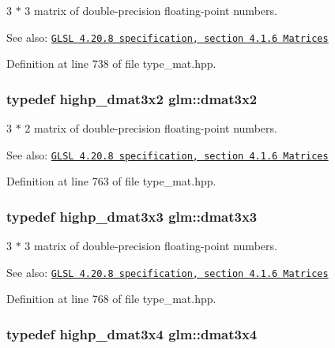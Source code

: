 3 $\ast$ 3 matrix of double-precision floating-point numbers.

\begin{Desc}
\item[See also:]\href{http://www.opengl.org/registry/doc/GLSLangSpec.4.20.8.pdf}{\tt GLSL 4.20.8 specification, section 4.1.6 Matrices} \end{Desc}


Definition at line 738 of file type\_\-mat.hpp.\hypertarget{group__core__types_g2db259d2e7921065c5b7d4dca9547960}{
\subsubsection[dmat3x2]{\setlength{\rightskip}{0pt plus 5cm}typedef highp\_\-dmat3x2 {\bf glm::dmat3x2}}}
\label{group__core__types_g2db259d2e7921065c5b7d4dca9547960}


3 $\ast$ 2 matrix of double-precision floating-point numbers.

\begin{Desc}
\item[See also:]\href{http://www.opengl.org/registry/doc/GLSLangSpec.4.20.8.pdf}{\tt GLSL 4.20.8 specification, section 4.1.6 Matrices} \end{Desc}


Definition at line 763 of file type\_\-mat.hpp.\hypertarget{group__core__types_gf3c29c4f75a448f308463e75ca2efd4c}{
\subsubsection[dmat3x3]{\setlength{\rightskip}{0pt plus 5cm}typedef highp\_\-dmat3x3 {\bf glm::dmat3x3}}}
\label{group__core__types_gf3c29c4f75a448f308463e75ca2efd4c}


3 $\ast$ 3 matrix of double-precision floating-point numbers.

\begin{Desc}
\item[See also:]\href{http://www.opengl.org/registry/doc/GLSLangSpec.4.20.8.pdf}{\tt GLSL 4.20.8 specification, section 4.1.6 Matrices} \end{Desc}


Definition at line 768 of file type\_\-mat.hpp.\hypertarget{group__core__types_g19e745a83cba85f57afa1232276dcc96}{
\subsubsection[dmat3x4]{\setlength{\rightskip}{0pt plus 5cm}typedef highp\_\-dmat3x4 {\bf glm::dmat3x4}}}
\label{group__core__types_g19e745a83cba85f57afa1232276dcc96}


